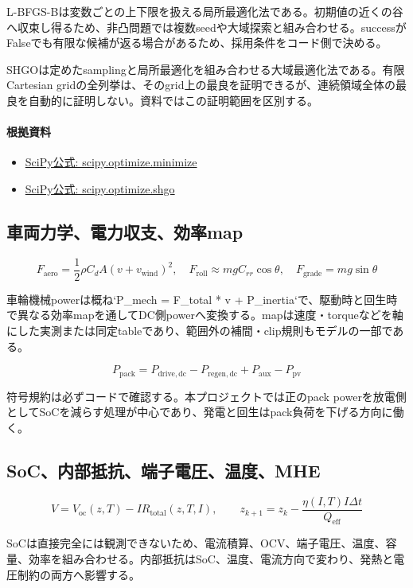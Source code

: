 \documentclass[a4paper,11pt]{article}
\begin{document}
L-BFGS-Bは変数ごとの上下限を扱える局所最適化法である。初期値の近くの谷へ収束し得るため、非凸問題では複数seedや大域探索と組み合わせる。successがFalseでも有限な候補が返る場合があるため、採用条件をコード側で決める。


SHGOは定めたsamplingと局所最適化を組み合わせる大域最適化法である。有限Cartesian gridの全列挙は、そのgrid上の最良を証明できるが、連続領域全体の最良を自動的に証明しない。資料ではこの証明範囲を区別する。

\paragraph{根拠資料}
\begin{itemize}[leftmargin=1.6em]
\item \href{https://docs.scipy.org/doc/scipy/reference/generated/scipy.optimize.minimize.html}{SciPy公式: scipy.optimize.minimize}
\item \href{https://docs.scipy.org/doc/scipy/reference/generated/scipy.optimize.shgo.html}{SciPy公式: scipy.optimize.shgo}
\end{itemize}

\subsection{車両力学、電力収支、効率map}
\[
F_{\mathrm{aero}}=\frac{1}{2}\rho C_dA(v+v_{\mathrm{wind}})^2,\quad F_{\mathrm{roll}}\approx mgC_{rr}\cos\theta,\quad F_{\mathrm{grade}}=mg\sin\theta
\]

車輪機械powerは概ね`P\_mech = F\_total * v + P\_inertia`で、駆動時と回生時で異なる効率mapを通してDC側powerへ変換する。mapは速度・torqueなどを軸にした実測または同定tableであり、範囲外の補間・clip規則もモデルの一部である。


\[
P_{\mathrm{pack}}=P_{\mathrm{drive,dc}}-P_{\mathrm{regen,dc}}+P_{\mathrm{aux}}-P_{\mathrm{pv}}
\]

符号規約は必ずコードで確認する。本プロジェクトでは正のpack powerを放電側としてSoCを減らす処理が中心であり、発電と回生はpack負荷を下げる方向に働く。



\subsection{SoC、内部抵抗、端子電圧、温度、MHE}
\[
V=V_{\mathrm{oc}}(z,T)-IR_{\mathrm{total}}(z,T,I),\qquad z_{k+1}=z_k-\frac{\eta(I,T)I\Delta t}{Q_{\mathrm{eff}}}
\]

SoCは直接完全には観測できないため、電流積算、OCV、端子電圧、温度、容量、効率を組み合わせる。内部抵抗はSoC、温度、電流方向で変わり、発熱と電圧制約の両方へ影響する。
\end{document}
